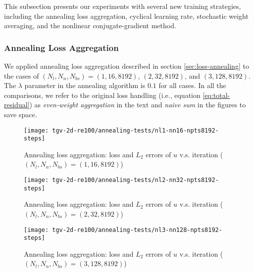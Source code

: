 This subsection presents our experiments with several new training strategies, including the annealing loss aggregation, cyclical learning rate, stochastic weight averaging, and the nonlinear conjugate-gradient method.

\subsubsection{Annealing Loss Aggregation}

We applied annealing loss aggregation described in section \ref{sec:loss-annealing} to the cases of $(N_l, N_n, N_{bs}) = (1, 16, 8192)$, $(2, 32, 8192)$, and $(3, 128, 8192)$.
The $\lambda$ parameter in the annealing algorithm is $0.1$ for all cases.
In all the comparisons, we refer to the original loss handling (i.e., equation \eqref{eq:total-residual}) as {\it even-weight aggregation} in the text and {\it naive sum} in the figures to save space.

\begin{figure}[hbt!]
    \centering%
    \texttt{[image: tgv-2d-re100/annealing-tests/nl1-nn16-npts8192-steps]}%
    \caption[%
        Annealing loss aggregation: loss and $L_2$ errors of $u$ v.s. iteration ($(N_l, N_n, N_{bs})=(1, 16, 8192)$)%
    ]{%
        Annealing loss aggregation: loss and $L_2$ errors of $u$ v.s. iteration ($(N_l, N_n, N_{bs})=(1, 16, 8192)$)%
    }\label{fig:annealing-tests-nl1-nn16-npts8192-steps}%
\end{figure}

\begin{figure}[hbt!]
    \centering%
    \texttt{[image: tgv-2d-re100/annealing-tests/nl2-nn32-npts8192-steps]}%
    \caption[%
        Annealing loss aggregation: loss and $L_2$ errors of $u$ v.s. iteration ($(N_l, N_n, N_{bs})=(2, 32, 8192)$)%
    ]{%
        Annealing loss aggregation: loss and $L_2$ errors of $u$ v.s. iteration ($(N_l, N_n, N_{bs})=(2, 32, 8192)$)%
    }\label{fig:annealing-tests-nl2-nn32-npts8192-steps}%
\end{figure}

\begin{figure}[hbt!]
    \centering%
    \texttt{[image: tgv-2d-re100/annealing-tests/nl3-nn128-npts8192-steps]}%
    \caption[%
        Annealing loss aggregation: loss and $L_2$ errors of $u$ v.s. iteration ($(N_l, N_n, N_{bs})=(3, 128, 8192)$)%
    ]{%
        Annealing loss aggregation: loss and $L_2$ errors of $u$ v.s. iteration ($(N_l, N_n, N_{bs})=(3, 128, 8192)$)%
    }\label{fig:annealing-tests-nl3-nn128-npts8192-steps}%
\end{figure}

